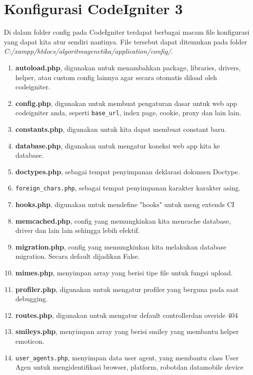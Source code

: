 \section{Konfigurasi CodeIgniter 3}
Di dalam folder config pada CodeIgniter terdapat berbagai macam file konfigurasi yang dapat kita atur sendiri nantinya. File tersebut dapat ditemukan pada folder \textit{C:/xampp/htdocs/algoritmagenetika/application/config/}.
\begin{enumerate}
    \item \textbf{autoload.php}, digunakan untuk menambahkan package, libraries, drivers, helper, atau custom config lainnya agar secara otomatis diload oleh codeigniter.
    \item \textbf{config.php}, digunakan untuk membuat pengaturan dasar untuk web app codeigniter anda, seperti \verb|base_url|, index page, cookie, proxy dan lain lain.
    \item \textbf{constants.php}, digunakan untuk kita dapat membuat constant baru.
    \item \textbf{database.php}, digunakan untuk mengatur koneksi web app kita ke database.
    \item \textbf{doctypes.php}, sebagai tempat penyimpanan deklarasi dokumen Doctype.
    \item \verb|foreign_chars.php|, sebagai tempat penyimpanan karakter karakter asing.
    \item \textbf{hooks.php}, digunakan untuk mendefine "hooks" untuk meng extends CI
    \item \textbf{memcached.php}, config yang memungkinkan kita mencache database, driver dan lain lain sehingga lebih efektif.
    \item \textbf{migration.php}, config yang memungkinkan kita melakukan database migration. Secara default dijadikan False.
    \item \textbf{mimes.php}, menyimpan array yang berisi tipe file untuk fungsi upload.
    \item \textbf{profiler.php}, digunakan untuk mengatur profiler yang berguna pada saat debugging.
    \item \textbf{routes.php}, digunakan untuk mengatur default controllerdan overide 404
    \item \textbf{smileys.php}, menyimpan array yang berisi smiley yang membantu helper emoticon.
    \item \verb|user_agents.php|, menyimpan data user agent, yang membantu class User Agen untuk mengidentifikasi browser, platform, robotdan datamobile device
\end{enumerate}

